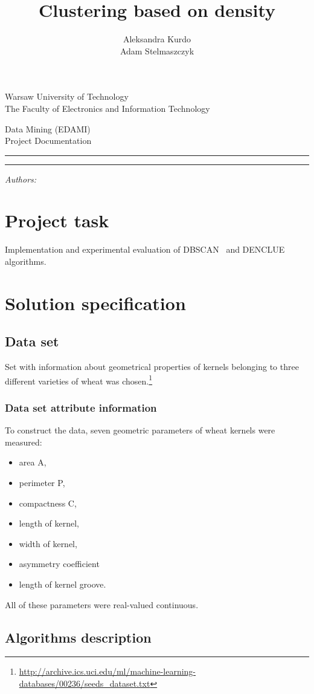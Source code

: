 \documentclass[12pt, a4paper, notitlepage, oneside]{article}
\title{Clustering based on density}
\author{Aleksandra Kurdo\\ Adam Stelmaszczyk}
\makeatletter
\newcommand{\linia}{\rule{\linewidth}{0.4mm}}
\renewcommand{\maketitle}{
\begin{titlepage}

    \vspace*{1cm}

    \begin{center}\small

    Warsaw University of Technology\\
    The Faculty of Electronics and Information Technology\\

    \end{center}

    \vspace{3cm}

     \begin{center}

    Data Mining (EDAMI)\\ Project Documentation

    \end{center}

    \noindent\linia

    \begin{center}

      \LARGE \textsc{\@title}

         \end{center}

     \noindent\linia

    \vspace{0.5cm}

    \begin{flushright}

    \begin{minipage}{5cm}

    \textit{\small Authors:}\\

    \normalsize \textsc{\@author} \par

    \end{minipage}

    \vspace{4cm}
    
 

     \end{flushright}

    \vspace*{\stretch{6}}

    \begin{center}

    \@date

    \end{center}

  \end{titlepage}
}
\makeatother
\begin{document}
\maketitle


\onehalfspacing


\section*{Project task}
Implementation and experimental evaluation of DBSCAN~\cite{dbscan} and DENCLUE~\cite{denclue} algorithms. 

\section*{Solution specification}

\subsection*{Data set}

Set with information about geometrical properties of kernels belonging to three different varieties of wheat was chosen.\footnote{\url{http://archive.ics.uci.edu/ml/machine-learning-databases/00236/seeds_dataset.txt}}

\subsubsection*{Data set attribute information}


To construct the data, seven geometric parameters of wheat kernels were measured: 

\begin{itemize}
	\item area A, 
	\item perimeter P, 
	\item compactness C, 
	\item length of kernel, 
	\item width of kernel, 
	\item asymmetry coefficient 
	\item length of kernel groove. 
\end{itemize}

All of these parameters were real-valued continuous.


\subsection*{Algorithms description}
 
\end{document}
